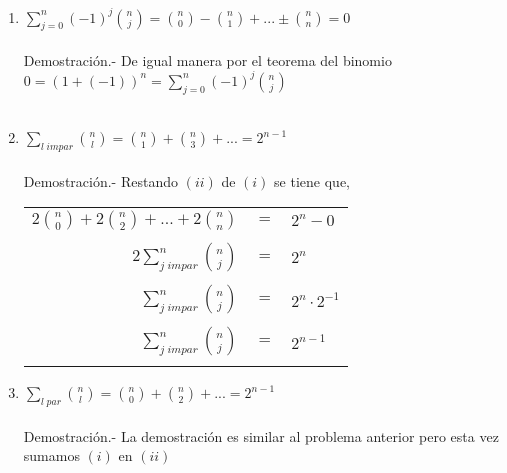 \begin{enumerate}
\begin{enumerate}[\bfseries (a)]
\begin{enumerate}[\bfseries (i)]
            \item $\displaystyle\sum_{j=0}^n (-1)^j {n \choose j} = {n \choose 0}- {n \choose 1}+...\pm {n \choose n} =0$\\\\
            Demostración.- \;  De igual manera por el teorema del binomio $0=(1+(-1))^n = \sum\limits_{j=0}^n(-1)^j {n \choose j}$\\\\ 

            \item $\displaystyle\sum_{l \; impar} {n \choose l} = {n \choose 1} + {n \choose 3}+ ... = 2^{n-1}$\\\\
            Demostración.- \;  Restando $(ii)$ de $(i)$ se tiene que,
              \begin{center}
                \begin{tabular}{rcl}
                  $2 {n \choose 0} + 2 {n \choose 2} + ... + 2{n \choose n}$&$=$&$2^n - 0$\\\\
                  $2\sum\limits_{j \; impar}^n {n \choose j} $&$=$&$2^n$\\\\ 
                  $\sum\limits_{j \; impar}^n {n \choose j}$&$=$&$2^n \cdot 2^{-1}$\\\\ 
                  $\sum\limits_{j \; impar}^n {n \choose j}$&$=$&$2^{n-1}$\\\\
                \end{tabular}
              \end{center}

            \item $\displaystyle\sum_{l \; par} {n \choose l} = {n \choose 0} + {n \choose 2} + ...  = 2^{n-1}$\\\\
            Demostración.- \; La demostración es similar al problema anterior pero esta vez sumamos $(i)$ en $(ii)$ \\\\ 
            \end{enumerate}
          \end{enumerate}


\end{enumerate}
